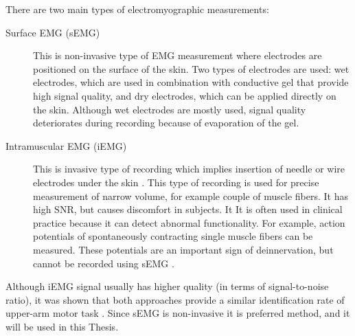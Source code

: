 There are two main types of electromyographic measurements: 
\begin{description}
\item[Surface EMG (sEMG)] This is non-invasive type of EMG measurement where electrodes are positioned on the surface of the skin. Two types of electrodes are used: wet electrodes, which are used in combination with conductive gel that provide high signal quality, and dry electrodes, which can be applied directly on the skin. Although wet electrodes are mostly used, signal quality deteriorates during recording because of evaporation of the gel.

\item[Intramuscular EMG (iEMG)] This is invasive type of recording which implies insertion of needle or wire electrodes under the skin \citep{Marateb1999}. This type of recording is used for precise measurement of narrow volume, for example couple of muscle fibers. It has high SNR, but causes discomfort in subjects. It It is often used in clinical practice because it can detect abnormal functionality. For example, action potentials of spontaneously contracting single muscle fibers can be measured. These potentials are an important sign of deinnervation, but cannot be recorded using sEMG \citep{Merletti-book}.
\end{description}

Although iEMG signal usually has higher quality (in terms of signal-to-noise ratio), it was shown that both approaches provide a similar identification rate of upper-arm motor task \citep{Hargrove2007}. Since sEMG is non-invasive it is preferred method, and it will be used in this Thesis.

